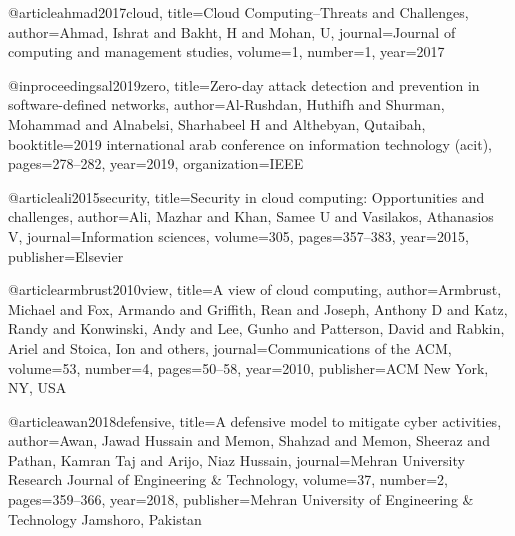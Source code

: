 @article{ahmad2017cloud,
  title={Cloud Computing--Threats and Challenges},
  author={Ahmad, Ishrat and Bakht, H and Mohan, U},
  journal={Journal of computing and management studies},
  volume={1},
  number={1},
  year={2017}
}








@inproceedings{al2019zero,
  title={Zero-day attack detection and prevention in software-defined networks},
  author={Al-Rushdan, Huthifh and Shurman, Mohammad and Alnabelsi, Sharhabeel H and Althebyan, Qutaibah},
  booktitle={2019 international arab conference on information technology (acit)},
  pages={278--282},
  year={2019},
  organization={IEEE}
}








@article{ali2015security,
  title={Security in cloud computing: Opportunities and challenges},
  author={Ali, Mazhar and Khan, Samee U and Vasilakos, Athanasios V},
  journal={Information sciences},
  volume={305},
  pages={357--383},
  year={2015},
  publisher={Elsevier}
}










@article{armbrust2010view,
  title={A view of cloud computing},
  author={Armbrust, Michael and Fox, Armando and Griffith, Rean and Joseph, Anthony D and Katz, Randy and Konwinski, Andy and Lee, Gunho and Patterson, David and Rabkin, Ariel and Stoica, Ion and others},
  journal={Communications of the ACM},
  volume={53},
  number={4},
  pages={50--58},
  year={2010},
  publisher={ACM New York, NY, USA}
}









@article{awan2018defensive,
  title={A defensive model to mitigate cyber activities},
  author={Awan, Jawad Hussain and Memon, Shahzad and Memon, Sheeraz and Pathan, Kamran Taj and Arijo, Niaz Hussain},
  journal={Mehran University Research Journal of Engineering \& Technology},
  volume={37},
  number={2},
  pages={359--366},
  year={2018},
  publisher={Mehran University of Engineering \& Technology Jamshoro, Pakistan}
}










